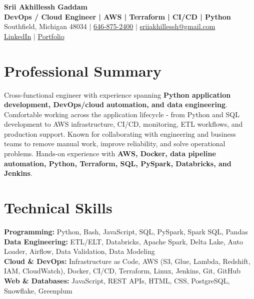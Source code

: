 \documentclass[letterpaper,10pt]{article}
\begin{document}
\fontsize{9.35pt}{10.45pt}\selectfont

\begin{center}
    {\LARGE \textbf{Srii Akhillessh Gaddam}} \\[-1pt]
    \textbf{DevOps / Cloud Engineer | AWS | Terraform | CI/CD | Python} \\[2pt]
    Southfield, Michigan 48034 $|$
    \href{tel:6468752400}{646-875-2400} $|$
    \href{mailto:sriiakhillessh@gmail.com}{sriiakhillessh@gmail.com} \\[1pt]
    \href{https://www.linkedin.com/in/srii-akhiilessh-gaddam-b48668191/}{LinkedIn} $|$
    \href{https://sriiakhillesshg.github.io/portfolio/}{Portfolio}
\end{center}
\vspace{-8pt}

\section{Professional Summary}
\small{Cross-functional engineer with experience spanning \textbf{Python application development, DevOps/cloud automation, and data engineering}. Comfortable working across the application lifecycle - from Python and SQL development to AWS infrastructure, CI/CD, monitoring, ETL workflows, and production support. Known for collaborating with engineering and business teams to remove manual work, improve reliability, and solve operational problems. Hands-on experience with \textbf{AWS, Docker, data pipeline automation, Python, Terraform, SQL, PySpark, Databricks, and Jenkins}.}

\section{Technical Skills}
\small{
\textbf{Programming:} Python, Bash, JavaScript, SQL, PySpark, Spark SQL, Pandas \\
\textbf{Data Engineering:} ETL/ELT, Databricks, Apache Spark, Delta Lake, Auto Loader, Airflow, Data Validation, Data Modeling \\
\textbf{Cloud \& DevOps:} Infrastructure as Code, AWS (S3, Glue, Lambda, Redshift, IAM, CloudWatch), Docker, CI/CD, Terraform, Linux, Jenkins, Git, GitHub \\
\textbf{Web \& Databases:} JavaScript, REST APIs, HTML, CSS, PostgreSQL, Snowflake, Greenplum
}
\end{document}
